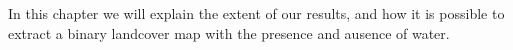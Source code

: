 In this chapter we will explain the extent of our results, and how it is possible to extract a binary landcover map with the presence and ausence of water.

